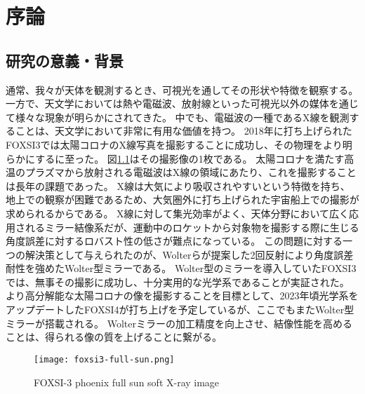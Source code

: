 \chapter{序論}
\thispagestyle{empty}
\label{chap1}
\graphicspath{{chap1/figure/}}
\minitoc


\newpage
\section{研究の意義・背景}
\label{chap1_background}

通常、我々が天体を観測するとき、可視光を通してその形状や特徴を観察する。
一方で、天文学においては熱や電磁波、放射線といった可視光以外の媒体を通じて様々な現象が明らかにされてきた。
中でも、電磁波の一種であるX線を観測することは、天文学において非常に有用な価値を持つ。
2018年に打ち上げられたFOXSI3では太陽コロナのX線写真を撮影することに成功し、その物理をより明らかにするに至った。\cite{weko_20796_1}
図\ref{fig:foxsi-fullsun-image}はその撮影像の1枚である。
太陽コロナを満たす高温のプラズマから放射される電磁波はX線の領域にあたり、これを撮影することは長年の課題であった。
X線は大気により吸収されやすいという特徴を持ち、地上での観察が困難であるため、大気圏外に打ち上げられた宇宙船上での撮影が求められるからである。
X線に対して集光効率がよく、天体分野において広く応用されるミラー結像系だが、運動中のロケットから対象物を撮影する際に生じる角度誤差に対するロバスト性の低さが難点になっている。
この問題に対する一つの解決策として与えられたのが、Wolterらが提案した2回反射により角度誤差耐性を強めたWolter型ミラーである。\cite{1952AnP...445...94W}
Wolter型のミラーを導入していたFOXSI3では、無事その撮影に成功し、十分実用的な光学系であることが実証された。
より高分解能な太陽コロナの像を撮影することを目標として、2023年頃光学系をアップデートしたFOXSI4が打ち上げを予定しているが、ここでもまたWolter型ミラーが搭載される。\cite{2019AGUFMSH31C3315V}
Wolterミラーの加工精度を向上させ、結像性能を高めることは、得られる像の質を上げることに繋がる。

\begin{figure}[h]
\centering
\texttt{[image: foxsi3-full-sun.png]}
\caption{FOXSI-3 phoenix full sun soft X-ray image}
\label{fig:foxsi-fullsun-image}
\end{figure}

\clearpage
\newpage

